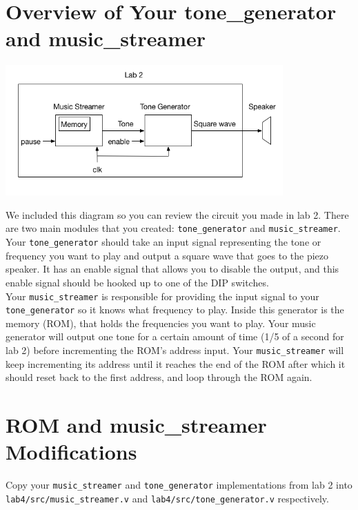 \documentclass[11pt]{article}
\begin{document}
\section{Overview of Your tone\_generator and music\_streamer}

\begin{center}
\includegraphics[height=5cm]{images/lab2_fig1.png}
\end{center}

We included this diagram so you can review the circuit you made in lab 2. There are two main modules that you created: \verb|tone_generator| and \verb|music_streamer|. \\

Your \verb|tone_generator| should take an input signal representing the tone or frequency you want to play and output a square wave that goes to the piezo speaker. It has an enable signal that allows you to disable the output, and this enable signal should be hooked up to one of the DIP switches.  \\

Your \verb|music_streamer| is responsible for providing the input signal to your \verb|tone_generator| so it knows what frequency to play. Inside this generator is the memory (ROM), that holds the frequencies you want to play. Your music generator will output one tone for a certain amount of time (1/5 of a second for lab 2) before incrementing the ROM's address input. Your \verb|music_streamer| will keep incrementing its address until it reaches the end of the ROM after which it should reset back to the first address, and loop through the ROM again.

\section{ROM and music\_streamer Modifications}
Copy your \verb|music_streamer| and \verb|tone_generator| implementations from lab 2 into \verb|lab4/src/music_streamer.v| and \verb|lab4/src/tone_generator.v| respectively. 
\end{document}
